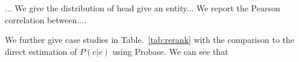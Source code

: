 ... We give the distribution of head give an entity... We report the Pearson correlation between....

We further give case studies in Table.~\ref{tab:rerank} with the comparison to the direct estimation of $P(c|e)$ using Probase. We can see that
%
